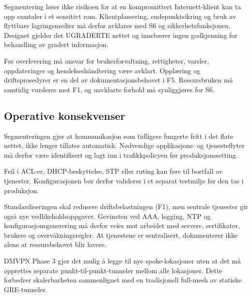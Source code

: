 Segmentering løser ikke risikoen for at en kompromittert Internett-klient kan ta opp samtaler i et sensitivt rom. Klientplassering, endepunktsikring og bruk av flyttbare lagringsmedier må derfor avklares med S6 og sikkerhetsfunksjonen. Designet gjelder det UGRADERTE nettet og innebærer ingen godkjenning for behandling av gradert informasjon.

Før overlevering må ansvar for brukerforvaltning, rettigheter, varsler, oppdateringer og hendelseshåndtering være avklart. Opplæring og driftsprosedyrer er en del av dokumentasjonsbehovet i F5. Ressursbruken må samtidig vurderes mot F1, og uavklarte forhold må synliggjøres for S6.

\subsection{Operative konsekvenser}
Segmenteringen gjør at kommunikasjon som tidligere fungerte fritt i det flate nettet, ikke lenger tillates automatisk. Nødvendige applikasjons- og tjenesteflyter må derfor være identifisert og lagt inn i trafikkpolicyen før produksjonssetting.

Feil i ACL-er, DHCP-beskyttelse, STP eller ruting kan føre til bortfall av tjenester. Konfigurasjonen bør derfor valideres i et separat testmiljø før den tas i produksjon.

Standardiseringen skal redusere driftsbelastningen (F1), men sentrale tjenester gir også nye vedlikeholdsoppgaver. Gevinsten ved AAA, logging, NTP og konfigurasjonsgenerering må derfor veies mot arbeidet med servere, sertifikater, brukere og overvåkningsregler. At tjenestene er sentralisert, dokumenterer ikke alene at ressursbehovet blir lavere.

DMVPN Phase 3 gjør det mulig å legge til nye spoke-lokasjoner uten at det må opprettes separate punkt-til-punkt-tunneler mellom alle lokasjoner. Dette forbedrer skalerbarheten sammenlignet med en tradisjonell full-mesh av statiske GRE-tunneler.

